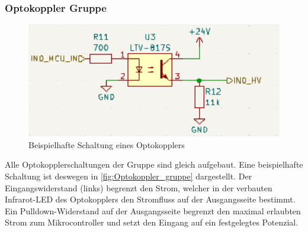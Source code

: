 \subsubsection{Optokoppler Gruppe}
\begin{figure}[H]
	\centering
	\includegraphics[width=1.0\textwidth]{images/Hardware/Optokoppler_BSP.PNG}
	\caption{Beispielhafte Schaltung eines Optokopplers}
	\label{fig:Optokoppler_gruppe}
\end{figure}
Alle Optokopplerschaltungen der Gruppe sind gleich aufgebaut. Eine beispielhafte Schaltung ist deswegen in \autoref{fig:Optokoppler_gruppe} dargestellt. Der Eingangswiderstand (links) begrenzt den Strom, welcher in der verbauten Infrarot-LED des Optokopplers den Stromfluss auf der Ausgangsseite bestimmt. Ein Pulldown-Widerstand auf der Ausgangsseite begrenzt den maximal erlaubten Strom zum Mikrocontroller und setzt den Eingang auf ein festgelegtes Potenzial.
